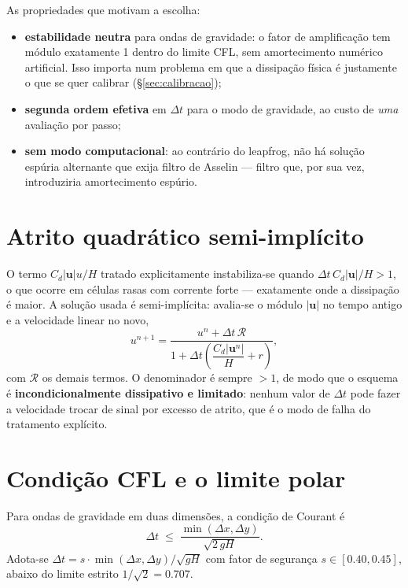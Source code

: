 \documentclass[11pt,a4paper,oneside]{report}
\theoremstyle{definition}
\theoremstyle{plain}
\theoremstyle{remark}
\newcommand{\vect}[1]{\bm{#1}}
\begin{document}
As propriedades que motivam a escolha:

\begin{itemize}
\item \textbf{estabilidade neutra} para ondas de gravidade: o fator de
  amplificação tem módulo exatamente 1 dentro do limite CFL, sem amortecimento
  numérico artificial. Isso importa num problema em que a dissipação física é
  justamente o que se quer calibrar (\S\ref{sec:calibracao});
\item \textbf{segunda ordem efetiva} em $\Delta t$ para o modo de gravidade,
  ao custo de \emph{uma} avaliação por passo;
\item \textbf{sem modo computacional}: ao contrário do leapfrog, não há solução
  espúria alternante que exija filtro de Asselin — filtro que, por sua vez,
  introduziria amortecimento espúrio.
\end{itemize}

\section{Atrito quadrático semi-implícito}

O termo $C_d|\vect{u}|u/H$ tratado explicitamente instabiliza-se quando
$\Delta t\,C_d|\vect{u}|/H>1$, o que ocorre em células rasas com corrente forte
— exatamente onde a dissipação é maior. A solução usada é semi-implícita:
avalia-se o módulo $|\vect{u}|$ no tempo antigo e a velocidade linear no novo,
\begin{equation}
u^{n+1}=\frac{u^{n}+\Delta t\,\mathcal{R}}
{1+\Delta t\left(\dfrac{C_d|\vect{u}^{n}|}{H}+r\right)},
\label{eq:semiimplicito}
\end{equation}
com $\mathcal{R}$ os demais termos. O denominador é sempre $>1$, de modo que o
esquema é \textbf{incondicionalmente dissipativo e limitado}: nenhum valor de
$\Delta t$ pode fazer a velocidade trocar de sinal por excesso de atrito, que é
o modo de falha do tratamento explícito.

\section{Condição CFL e o limite polar}
\label{sec:cfl}

Para ondas de gravidade em duas dimensões, a condição de Courant é
\begin{equation}
\Delta t\;\le\;\frac{\min(\Delta x,\Delta y)}{\sqrt{2\,gH}} .
\end{equation}
Adota-se $\Delta t=s\cdot\min(\Delta x,\Delta y)/\sqrt{gH}$ com fator de
segurança $s\in[\num{0.40},\num{0.45}]$, abaixo do limite estrito
$1/\sqrt2=\num{0.707}$.
\end{document}
